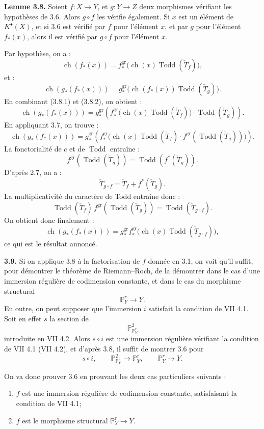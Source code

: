 \documentclass[11pt]{article}
\newcommand{\ch}{\operatorname{ch}}
\newcommand{\Todd}{\operatorname{Todd}}
\providecommand{\ch}{\operatorname{ch}}
\providecommand{\Todd}{\operatorname{Todd}}
\begin{document}
\textbf{Lemme 3.8.} Soient \(f:X\to Y\), et \(g:Y\to Z\) deux morphismes vérifiant les hypothèses de 3.6. Alors \(g\circ f\) les vérifie également. Si \(x\) est un élément de \(K^{\bullet}(X)\), et si 3.6 est vérifié par \(f\) pour l'élément \(x\), et par \(g\) pour l'élément \(f_*(x)\), alors il est vérifié par \(g\circ f\) pour l'élément \(x\).

Par hypothèse, on a :
\begin{equation}\tag{3.8.1}
 \ch(f_*(x))=
 f^{\mathrm{gr}}_*\bigl(\ch(x)\Todd(\check T_f)\bigr),
\end{equation}
et :
\begin{equation}\tag{3.8.2}
 \ch(g_*(f_*(x)))=
 g^{\mathrm{gr}}_*\bigl(\ch(f_*(x))\Todd(\check T_g)\bigr).
\end{equation}
En combinant (3.8.1) et (3.8.2), on obtient :
\[
\ch(g_*(f_*(x)))=
g^{\mathrm{gr}}_*\!\left(
 f^{\mathrm{gr}}_*\bigl(\ch(x)\Todd(\check T_f)\bigr)\cdot \Todd(\check T_g)
\right).
\]
En appliquant 3.7, on trouve :
\[
\ch(g_*(f_*(x)))=
g^{\mathrm{gr}}_*\!\left(
 f^{\mathrm{gr}}_*\bigl(\ch(x)\Todd(\check T_f)\cdot
 f^{\mathrm{gr}}(\Todd(\check T_g))\bigr)
\right).
\]
La fonctorialité de \(c\) et de \(\Todd\) entraîne :
\[
 f^{\mathrm{gr}}(\Todd(\check T_g))=\Todd(f^*(\check T_g)).
\]
D'après 2.7, on a :
\[
 \check T_{g\circ f}=\check T_f+f^*(\check T_g).
\]
La multiplicativité du caractère de Todd entraîne donc :
\[
 \Todd(\check T_f)\,f^{\mathrm{gr}}(\Todd(\check T_g))
 =
 \Todd(\check T_{g\circ f}).
\]
On obtient donc finalement :
\[
 \ch(g_*(f_*(x)))=
 g^{\mathrm{gr}}_* f^{\mathrm{gr}}_*\bigl(\ch(x)\Todd(\check T_{g\circ f})\bigr),
\]
ce qui est le résultat annoncé.

\textbf{3.9.} Si on applique 3.8 à la factorisation de \(f\) donnée en 3.1, on voit qu'il suffit, pour démontrer le théorème de Riemann--Roch, de la démontrer dans le cas d'une immersion régulière de codimension constante, et dans le cas du morphisme structural
\[
 \mathbb P^r_Y\longrightarrow Y .
\]
En outre, on peut supposer que l'immersion \(i\) satisfait la condition de VII 4.1. Soit en effet \(s\) la section de
\[
 \mathbb P^2_{\mathbb P^r_Y}
\]
introduite en VII 4.2. Alors \(s\circ i\) est une immersion régulière vérifiant la condition de VII 4.1 (VII 4.2), et d'après 3.8, il suffit de montrer 3.6 pour
\[
s\circ i,\qquad
\mathbb P^2_{\mathbb P^r_Y}\longrightarrow\mathbb P^r_Y,\qquad
\mathbb P^r_Y\longrightarrow Y .
\]

On va donc prouver 3.6 en prouvant les deux cas particuliers suivants :
\begin{enumerate}[label=\roman*)]
\item \(f\) est une immersion régulière de codimension constante, satisfaisant la condition de VII 4.1;
\item \(f\) est le morphisme structural \(\mathbb P^r_Y\to Y\).
\end{enumerate}
\end{document}
